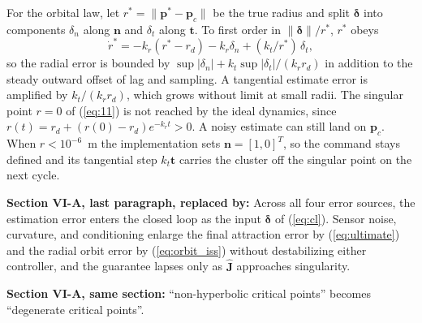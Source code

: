 \documentclass[10pt]{article}
\begin{document}
For the orbital law, let $r^* = \|\mathbf{p}^* - \mathbf{p}_c\|$ be the true radius and split $\boldsymbol{\delta}$ into components $\delta_n$ along $\mathbf{n}$ and $\delta_t$ along $\mathbf{t}$. To first order in $\|\boldsymbol{\delta}\|/r^*$, $r^*$ obeys
\begin{equation}\label{eq:orbit_iss}
\dot{r}^* = -k_r(r^* - r_d) - k_r\delta_n + (k_t/r^*)\,\delta_t,
\end{equation}
so the radial error is bounded by $\sup|\delta_n| + k_t\sup|\delta_t|/(k_r r_d)$ in addition to the steady outward offset of lag and sampling. A tangential estimate error is amplified by $k_t/(k_r r_d)$, which grows without limit at small radii. The singular point $r = 0$ of (\ref{eq:11}) is not reached by the ideal dynamics, since $r(t) = r_d + (r(0) - r_d)e^{-k_r t} > 0$. A noisy estimate can still land on $\mathbf{p}_c$. When $r < 10^{-6}$~m the implementation sets $\mathbf{n} = [1, 0]^T$, so the command stays defined and its tangential step $k_t\mathbf{t}$ carries the cluster off the singular point on the next cycle.

\bigskip
\noindent\textbf{Section VI-A, last paragraph, replaced by:} Across all four error sources, the estimation error enters the closed loop as the input $\boldsymbol{\delta}$ of (\ref{eq:cl}). Sensor noise, curvature, and conditioning enlarge the final attraction error by (\ref{eq:ultimate}) and the radial orbit error by (\ref{eq:orbit_iss}) without destabilizing either controller, and the guarantee lapses only as $\hat{\mathbf{J}}$ approaches singularity.

\noindent\textbf{Section VI-A, same section:} ``non-hyperbolic critical points'' becomes ``degenerate critical points''.
\end{document}
